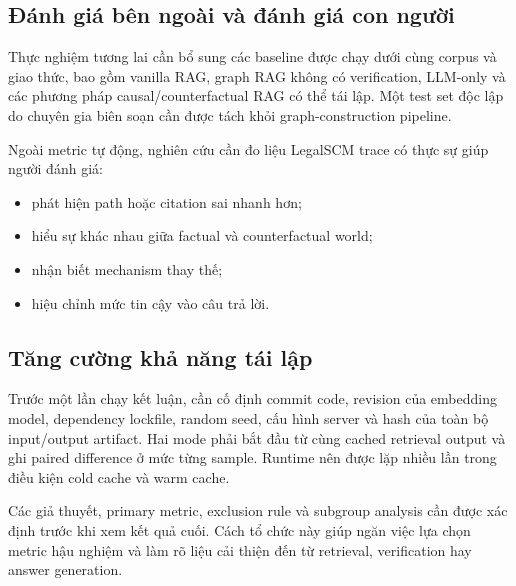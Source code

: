\subsection{Đánh giá bên ngoài và đánh giá con người}

Thực nghiệm tương lai cần bổ sung các baseline được chạy dưới cùng corpus và
giao thức, bao gồm vanilla RAG, graph RAG không có verification, LLM-only và
các phương pháp causal/counterfactual RAG có thể tái lập. Một test set độc
lập do chuyên gia biên soạn cần được tách khỏi graph-construction pipeline.

Ngoài metric tự động, nghiên cứu cần đo liệu LegalSCM trace có thực sự giúp
người đánh giá:

\begin{itemize}
    \item phát hiện path hoặc citation sai nhanh hơn;
    \item hiểu sự khác nhau giữa factual và counterfactual world;
    \item nhận biết mechanism thay thế;
    \item hiệu chỉnh mức tin cậy vào câu trả lời.
\end{itemize}

\subsection{Tăng cường khả năng tái lập}

Trước một lần chạy kết luận, cần cố định commit code, revision của embedding
model, dependency lockfile, random seed, cấu hình server và hash của toàn bộ
input/output artifact. Hai mode phải bắt đầu từ cùng cached retrieval output
và ghi paired difference ở mức từng sample. Runtime nên được lặp nhiều lần
trong điều kiện cold cache và warm cache.

Các giả thuyết, primary metric, exclusion rule và subgroup analysis cần được
xác định trước khi xem kết quả cuối. Cách tổ chức này giúp ngăn việc lựa chọn
metric hậu nghiệm và làm rõ liệu cải thiện đến từ retrieval, verification hay
answer generation.